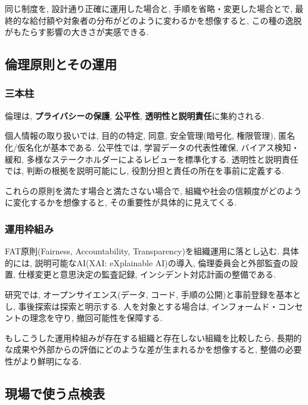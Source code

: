 同じ制度を, 設計通り正確に運用した場合と, 手順を省略・変更した場合とで, 最終的な給付額や対象者の分布がどのように変わるかを想像すると, この種の逸脱がもたらす影響の大きさが実感できる.

\subsection{倫理原則とその運用}

\subsubsection{三本柱}

倫理は, \textbf{プライバシーの保護}, \textbf{公平性}, \textbf{透明性と説明責任}に集約される.  

個人情報の取り扱いでは, 目的の特定, 同意, 安全管理(暗号化, 権限管理), 匿名化/仮名化が基本である.  
公平性では, 学習データの代表性確保, バイアス検知・緩和, 多様なステークホルダーによるレビューを標準化する.  
透明性と説明責任では, 判断の根拠を説明可能にし, 役割分担と責任の所在を事前に定義する.  

これらの原則を満たす場合と満たさない場合で, 組織や社会の信頼度がどのように変化するかを想像すると, その重要性が具体的に見えてくる.

\subsubsection{運用枠組み}

FAT原則(Fairness, Accountability, Transparency)を組織運用に落とし込む.  
具体的には, 説明可能なAI(XAI: eXplainable AI)の導入, 倫理委員会と外部監査の設置, 仕様変更と意思決定の監査記録, インシデント対応計画の整備である.  

研究では, オープンサイエンス(データ, コード, 手順の公開)と事前登録を基本とし, 事後探索は探索と明示する.  
人を対象とする場合は, インフォームド・コンセントの理念を守り, 撤回可能性を保障する.  

もしこうした運用枠組みが存在する組織と存在しない組織を比較したら, 長期的な成果や外部からの評価にどのような差が生まれるかを想像すると, 整備の必要性がより鮮明になる.

\subsection{現場で使う点検表}

